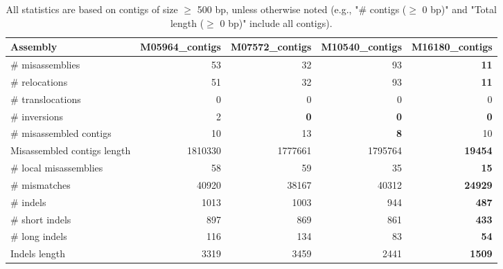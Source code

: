 \documentclass[12pt,a4paper]{article}
\begin{document}
\begin{table}[ht]
\begin{center}
\caption{All statistics are based on contigs of size $\geq$ 500 bp, unless otherwise noted (e.g., "\# contigs ($\geq$ 0 bp)" and "Total length ($\geq$ 0 bp)" include all contigs).}
\begin{tabular}{|l*{4}{|r}|}
\hline
Assembly & M05964\_contigs & M07572\_contigs & M10540\_contigs & M16180\_contigs \\ \hline
\# misassemblies & 53 & 32 & 93 & {\bf 11} \\ \hline
\hspace{5mm}\# relocations & 51 & 32 & 93 & {\bf 11} \\ \hline
\hspace{5mm}\# translocations & 0 & 0 & 0 & 0 \\ \hline
\hspace{5mm}\# inversions & 2 & {\bf 0} & {\bf 0} & {\bf 0} \\ \hline
\# misassembled contigs & 10 & 13 & {\bf 8} & 10 \\ \hline
Misassembled contigs length & 1810330 & 1777661 & 1795764 & {\bf 19454} \\ \hline
\# local misassemblies & 58 & 59 & 35 & {\bf 15} \\ \hline
\# mismatches & 40920 & 38167 & 40312 & {\bf 24929} \\ \hline
\# indels & 1013 & 1003 & 944 & {\bf 487} \\ \hline
\hspace{5mm}\# short indels & 897 & 869 & 861 & {\bf 433} \\ \hline
\hspace{5mm}\# long indels & 116 & 134 & 83 & {\bf 54} \\ \hline
Indels length & 3319 & 3459 & 2441 & {\bf 1509} \\ \hline
\end{tabular}
\end{center}
\end{table}
\end{document}
